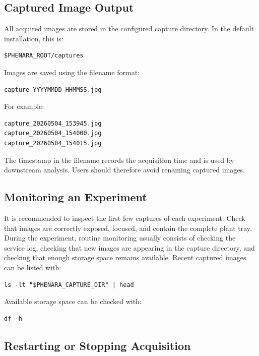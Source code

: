 \subsection{Captured Image Output}

All acquired images are stored in the configured capture directory. In the default installation, this is:

\begin{verbatim}
$PHENARA_ROOT/captures
\end{verbatim}

Images are saved using the filename format:

\begin{verbatim}
capture_YYYYMMDD_HHMMSS.jpg
\end{verbatim}

For example:

\begin{verbatim}
capture_20260504_153945.jpg
capture_20260504_154000.jpg
capture_20260504_154015.jpg
\end{verbatim}

The timestamp in the filename records the acquisition time and is used by
downstream analysis. Users should therefore avoid renaming captured images.

\subsection{Monitoring an Experiment}

It is recommended to inspect the first few captures of each experiment. Check
that images are correctly exposed, focused, and contain the complete plant
tray. During the experiment, routine monitoring usually consists of checking
the service log, checking that new images are appearing in the capture
directory, and checking that enough storage space remains available. Recent
captured images can be listed with:

\begin{verbatim}
ls -lt "$PHENARA_CAPTURE_DIR" | head
\end{verbatim}

Available storage space can be checked with:

\begin{verbatim}
df -h
\end{verbatim}

\subsection{Restarting or Stopping Acquisition}

